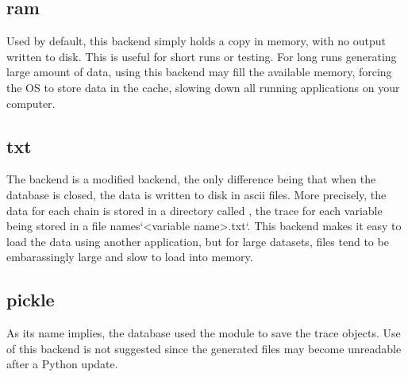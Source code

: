 
\hypertarget{ram}{}
\subsection*{ram}
\label{ram}

Used by default, this backend simply holds a copy in memory, with no output written to disk. This is useful for short runs or testing. For long runs generating large amount of data, using this backend may fill the available memory, forcing the OS to store data in the cache, slowing down all running applications on your computer.



\hypertarget{txt}{}
\subsection*{txt}
\label{txt}

The  backend is a modified  backend, the only difference being that when the database is closed, the data is written to disk in ascii files. More precisely, the data for each chain is stored in a directory called , the trace for each variable being stored in a file names`{\textless}variable name{\textgreater}.txt`. This backend makes it easy to load the data using another application, but for large datasets, files tend to be embarassingly large and slow to load into memory.



\hypertarget{pickle}{}
\subsection*{pickle}
\label{pickle}

As its name implies, the  database used the  module to save the trace objects. Use of this backend is not suggested since the generated files may become unreadable after a Python update.



\hypertarget{sqlite}{}
